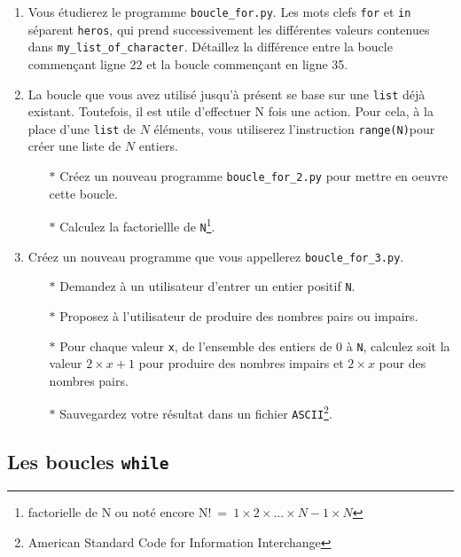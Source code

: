 \begin{enumerate}
\item Vous  étudierez le programme \texttt{boucle\_for.py}.   Les mots
  clefs \texttt{for} et \texttt{in} séparent \texttt{heros}, qui prend
  successivement    les    différentes    valeurs    contenues    dans
  \texttt{my\_list\_of\_character}.  Détaillez la  différence entre la
  boucle commençant ligne 22 et la boucle commençant en ligne 35.

\item La boucle que vous avez  utilisé jusqu'à présent se base sur une
  \texttt{list} déjà existant.  Toutefois,  il est utile d'effectuer N
  fois une  action. Pour cela, à  la place d'une \texttt{list}  de $N$
  éléments, vous utiliserez  l'instruction \texttt{range(N)}pour créer
  une liste de $N$ entiers.
  \begin{itemize}
  \item[$\ast$]  Créez un  nouveau  programme \texttt{boucle\_for\_2.py}  pour
    mettre en oeuvre cette boucle.
  \item[$\ast$] Calculez la factoriellle de \texttt{N}\footnote{factorielle de
    N ou noté encore N!~=~$1 \times 2 \times... \times N-1 \times N$}.
  \end{itemize}


  
\item    Créez   un    nouveau   programme    que   vous    appellerez
  \texttt{boucle\_for\_3.py}.
  \begin{itemize}
  \item[$\ast$]  Demandez   à  un  utilisateur  d'entrer   un  entier  positif
    \texttt{N}.
  \item[$\ast$]  Proposez à  l'utilisateur de  produire des  nombres pairs  ou
    impairs.
  \item[$\ast$] Pour chaque valeur \texttt{x},  de l'ensemble des entiers de 0
    à \texttt{N}, calculez soit la  valeur $2\times x+1$ pour produire
    des nombres impairs et $2\times x$ pour des nombres pairs.
  \item[$\ast$]    Sauvegardez     votre    résultat    dans     un    fichier
    \texttt{ASCII}\footnote{American  Standard  Code  for  Information
      Interchange}.
  \end{itemize}

\end{enumerate}




\subsection{Les boucles \texttt{while}}

